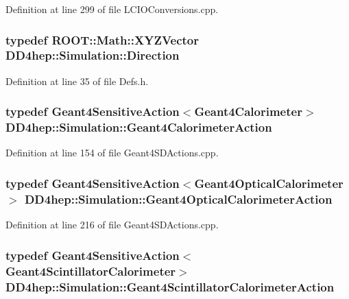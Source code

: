 Definition at line 299 of file LCIOConversions.cpp.\hypertarget{namespace_d_d4hep_1_1_simulation_a4b5bfd838293f3222b9d004c7dd1d6b3}{
\subsubsection[{Direction}]{\setlength{\rightskip}{0pt plus 5cm}typedef ROOT::Math::XYZVector {\bf DD4hep::Simulation::Direction}}}
\label{namespace_d_d4hep_1_1_simulation_a4b5bfd838293f3222b9d004c7dd1d6b3}


Definition at line 35 of file Defs.h.\hypertarget{namespace_d_d4hep_1_1_simulation_af49169edf9a8a04f3255a2b126698128}{
\subsubsection[{Geant4CalorimeterAction}]{\setlength{\rightskip}{0pt plus 5cm}typedef {\bf Geant4SensitiveAction}$<${\bf Geant4Calorimeter}$>$ {\bf DD4hep::Simulation::Geant4CalorimeterAction}}}
\label{namespace_d_d4hep_1_1_simulation_af49169edf9a8a04f3255a2b126698128}


Definition at line 154 of file Geant4SDActions.cpp.\hypertarget{namespace_d_d4hep_1_1_simulation_a9b4de3b53a0e39ec195ab057b9b3b971}{
\subsubsection[{Geant4OpticalCalorimeterAction}]{\setlength{\rightskip}{0pt plus 5cm}typedef {\bf Geant4SensitiveAction}$<${\bf Geant4OpticalCalorimeter}$>$ {\bf DD4hep::Simulation::Geant4OpticalCalorimeterAction}}}
\label{namespace_d_d4hep_1_1_simulation_a9b4de3b53a0e39ec195ab057b9b3b971}


Definition at line 216 of file Geant4SDActions.cpp.\hypertarget{namespace_d_d4hep_1_1_simulation_a518721ad629e0c574145b27d7e1e0c36}{
\subsubsection[{Geant4ScintillatorCalorimeterAction}]{\setlength{\rightskip}{0pt plus 5cm}typedef {\bf Geant4SensitiveAction}$<${\bf Geant4ScintillatorCalorimeter}$>$ {\bf DD4hep::Simulation::Geant4ScintillatorCalorimeterAction}}}
\label{namespace_d_d4hep_1_1_simulation_a518721ad629e0c574145b27d7e1e0c36}


